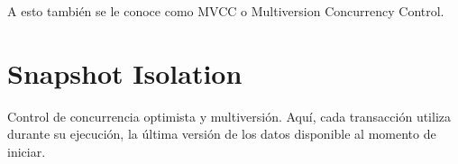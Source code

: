 A esto también se le conoce como MVCC o Multiversion Concurrency Control.

\section{Snapshot Isolation}
Control de concurrencia optimista y multiversión. Aquí, cada transacción utiliza durante su ejecución, la última versión de los datos disponible al momento de iniciar.


